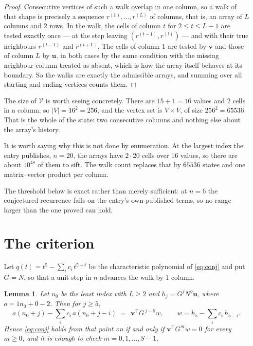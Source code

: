 \documentclass[11pt,a4paper]{article}
\theoremstyle{plain}
\newtheorem{lemma}[theorem]{Lemma}
\theoremstyle{definition}
\begin{document}
\begin{proof}
Consecutive vertices of such a walk overlap in one column, so a walk of that shape is
precisely a sequence $r^{(1)},\dots,r^{(L)}$ of columns, that is, an array of $L$ columns
and $2$ rows. In the walk, the cells of column $t$ for $2\le t\le L-1$ are tested
exactly once --- at the step leaving $(r^{(t-1)},r^{(t)})$ --- and with their true
neighbours $r^{(t-1)}$ and $r^{(t+1)}$. The cells of column $1$ are tested by
$\mathbf{v}$ and those of column $L$ by $\mathbf{u}$, in both cases by the same condition
with the missing neighbour column treated as absent, which is how the array itself behaves at
its boundary. So the walks are exactly the admissible arrays, and summing over all starting
and ending vertices counts them.
\end{proof}


The size of $\mathcal V$ is worth seeing concretely. There are $15+1=16$ values
and $2$ cells in a column, so $|V|=16^{2}=256$, and the vertex set is
$V\times V$, of size $256^2=65536$. That is the whole of the state: two consecutive
columns and nothing else about the array's history.

It is worth saying why this is not done by enumeration. At the largest index the entry
publishes, $n=20$, the arrays have $2\cdot20$ cells over
$16$ values, so there are about $10^{48}$ of them to sift. The
walk count replaces that by $65536$ states and one matrix--vector product per column.

The threshold below is exact rather than merely sufficient: at $n=6$ the conjectured
recurrence fails on the entry's own published terms, so no range larger than the one proved
can hold.
\section{The criterion}

Let $q(t)=t^{5}-\sum_i c_i\,t^{5-i}$ be the characteristic polynomial of
\eqref{eq:conj} and put $G=N$, so that a unit step in $n$ advances the walk by
$1$ column.

\begin{lemma}\label{lem:crit}
Let $n_0$ be the least index with $L\ge2$ and $h_j=G^{j}N^{o}\mathbf{u}$, where
$o=1n_0+0-2$. Then for $j\ge5$,
\[
a(n_0+j)-\sum_i c_i\,a(n_0+j-i)\;=\;\,\mathbf{v}^{\!\top}G^{\,j-5}w,
\qquad w=h_{5}-\sum_i c_i\,h_{5-i} .
\]
Hence \eqref{eq:conj} holds from that point on if and only if
$\mathbf{v}^{\!\top}G^{m}w=0$ for every $m\ge0$, and it is enough to check
$m=0,1,\dots,S-1$.
\end{lemma}
\end{document}
